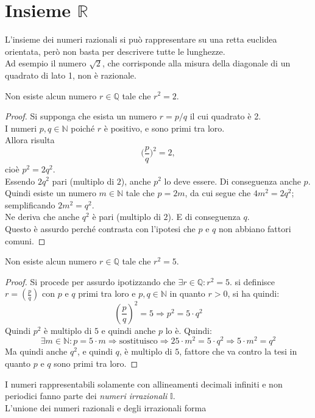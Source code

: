 \documentclass[a4paper,12pt, oneside]{book}
\begin{document}
\section{Insieme $\mathbb{R}$} L'insieme dei numeri razionali si può
rappresentare su una retta euclidea orientata, però non basta per descrivere
tutte le lunghezze.\\ Ad esempio il numero $\sqrt{2}$, che corrisponde alla
misura della diagonale di un quadrato di lato 1, non è razionale.
\begin{teorema} Non esiste alcun numero $r\in\mathbb{Q}$ tale che $r^2=2$.
\end{teorema}
\begin{proof} Si supponga che esista un numero $r=p/q$ il cui quadrato è 2.\\ I
  numeri $p,q\in\mathbb{N}$ poiché $r$ è positivo, e sono primi tra loro.\\ Allora
  risulta
  $$\Big(\frac{p}{q}\Big)^2=2,$$
  cioè $p^2=2q^2$.\\ Essendo $2q^2$ pari (multiplo di $2$), anche $p^2$ lo deve
  essere. Di conseguenza anche $p$.\\ Quindi esiste un numero $m\in\mathbb{N}$
  tale che $p=2m$, da cui segue che $4m^2=2q^2$; semplificando $2m^2=q^2$.\\ Ne
  deriva che anche $q^2$ è pari (multiplo di $2$). E di conseguenza $q$.\\ Questo
  è assurdo perché contrasta con l'ipotesi che $p$ e $q$ non abbiano fattori
  comuni.
\end{proof}
\begin{teorema} Non esiste alcun numero $r\in\mathbb{Q}$ tale che $r^2=5$.
\end{teorema}
\begin{proof} Si procede per assurdo ipotizzando che $\exists r\in
  \mathbb{Q}:r^2=5$.  si definisce $r=\left(\frac{p}{q}\right)$ con $p$ e $q$
  primi tra loro e $p,q\in \mathbb{N}$ in quanto $r>0$, si ha quindi:
  $${\left(\frac{p}{q}\right)}^2=5\Rightarrow p^2=5\cdot q^2$$
  Quindi $p^2$ è multiplo di $5$ e quindi anche $p$ lo è. Quindi:
  $$\exists m\in\mathbb{N}:p=5\cdot m\Rightarrow\mbox{sostituisco}\Rightarrow 25\cdot m^2=5\cdot q^2\Rightarrow 5\cdot m^2=q^2$$
  Ma quindi anche $q^2$, e quindi $q$, è multiplo di $5$, fattore che va contro
  la tesi in quanto $p$ e $q$ sono primi tra loro.
\end{proof} I numeri rappresentabili solamente con allineamenti decimali
infiniti e non periodici fanno parte dei \emph{numeri irrazionali}
$\mathbb{I}$.\\ L'unione dei numeri razionali e degli irrazionali forma
\end{document}
